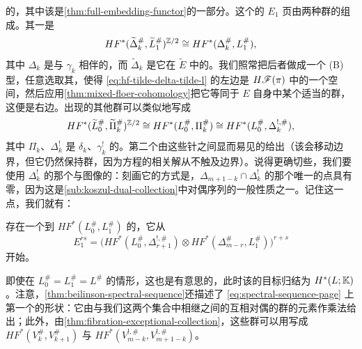 的\trSpectralSequence，其中该\trIsomorphism{}是\cref{thm:full-embedding-functor}的一部分。这个\trSpectralSequence{}的 $E_1$ 页由两种\trFloer{}群的\trTensorProduct{}组成。其一是
\begin{equation}\label{eq:hf-tilde-delta-tilde-l}
HF^{*}(\widetilde{\Delta}^{\#}_k,\widetilde{L}^{\#}_1)^{\mathbb{Z}/2}\cong HF^{*}(\Delta^{\#}_k,L^{\#}_1),
\end{equation}
其中 $\Delta_k$ 是与 $\gamma_k$ 相伴的\trLefschetzThimble，而 $\widetilde{\Delta}_k$ 是它在 $\widetilde{E}$ 中的\trPreimage。我们照常把后者做成一个 (B) 型\trEquivariant\trBrane，任意选取其\trGrading，使得 \eqref{eq:hf-tilde-delta-tilde-l} 的左边是 $H\mathscr{F}(\pi)$ 中的一个\trMorphism{}空间，然后应用\cref{thm:mixed-floer-cohomology}把它等同于 $E$ 自身中某个适当的\trFloerCohomology{}群，这便是右边。出现的其他\trFloer{}群可以类似地写成
\begin{equation*}
HF^{*}(\widetilde{L}^{\#}_0,\widetilde{\Pi}^{\#}_k)^{\mathbb{Z}/2}\cong HF^{*}(L^{\#}_0,\Pi^{\#}_k)\cong HF^{*}(L^{\#}_0,\Delta^{!,\#}_k),
\end{equation*}
其中 $\Pi_k$、$\Delta^{!}_k$ 是 $\delta_k$、$\gamma^{!}_k$ 的\trLefschetzThimble。第二个\trIsomorphism{}由这些针之间显而易见的\trIsotopy{}给出（该\trIsotopy{}会移动边界，但它仍然保持\trFloerCohomology{}群，因为\trFloer{}方程的相关解从不触及边界）。说得更确切些，我们要使用 $\Delta^{!}_k$ 的那个与\trMutation{}图像\trCompatible{}的\trGrading：刻画它的方式是，$\Delta_{m+1-k}\cap\Delta^{!}_k$ 的那个唯一的点具有零\trMaslovIndex，因为这是\cref{sub:koszul-dual-collection}中\trKoszul{}对偶序列的一般性质之一。记住这一点，我们就有：
\begin{corollary}\label{thm:thimble-spectral-sequence}
存在一个\trConvergence{}到 $HF^{*}(L^{\#}_0,L^{\#}_1)$ 的\trSpectralSequence，它从
\begin{equation}\label{eq:spectral-sequence-page}
E_1^{rs}=\bigl(HF^{*}(L^{\#}_0,\Delta^{!,\#}_{r+1})\otimes HF^{*}(\Delta^{\#}_{m-r},L^{\#}_1)\bigr)^{r+s}
\end{equation}
开始。
\end{corollary}
\noqed
即使在 $L^{\#}_0=L^{\#}_1=L^{\#}$ 的情形，这也是有意思的，此时该\trSpectralSequence{}的目标归结为 $H^{*}(L;\mathbb{K})$。注意，\cref{thm:beilinson-spectral-sequence}还描述了 \eqref{eq:spectral-sequence-page} 上第一个\trDifferential{}的形状：它由与我们这两个集合中相继\trObject{}之间的互相对偶的\trMorphism{}群的元素作乘法给出；此外，由\cref{thm:fibration-exceptional-collection}，这些群可以用\trVanishingCycle{}写成 $HF^{*}(V^{\#}_k,V^{\#}_{k+1})$ 与 $HF^{*}(V^{!,\#}_{m-k},V^{!,\#}_{m+1-k})$。
